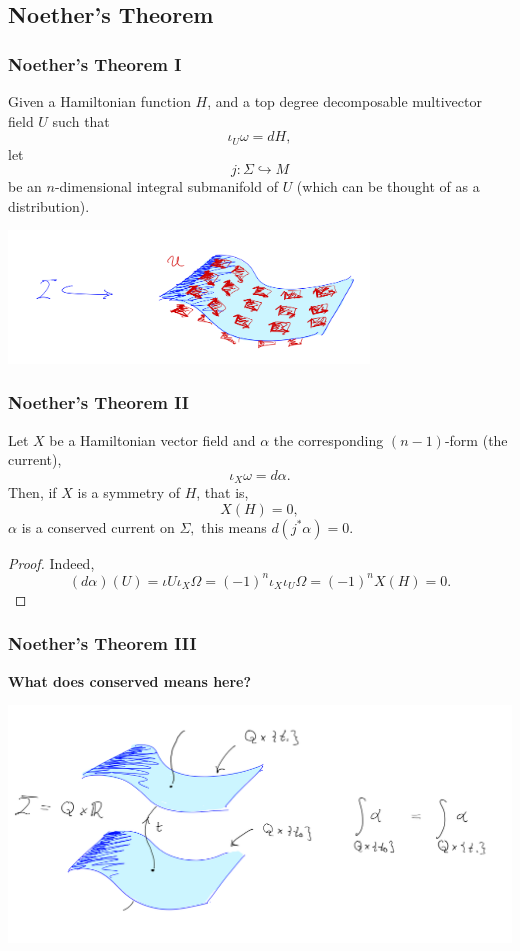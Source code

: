 \subsection{Noether's Theorem}
\begin{frame}
    \frametitle{Noether's Theorem I}
    Given a Hamiltonian function $H$, and a top degree decomposable multivector field $U$ such that 
    $$\iota_U \omega = dH,$$ let $$j: \Sigma \hookrightarrow M$$ be an $n$-dimensional integral submanifold of $U$ (which can be thought of as a distribution).
    \begin{center}
        \includegraphics[height = 100pt]{Images/Multivector_variations.PNG}
    \end{center} 
\end{frame}

\begin{frame}
    \frametitle{Noether's Theorem II}
    \begin{theorem}Let $X$ be a Hamiltonian vector field and $\alpha$ the corresponding $(n-1)$-form (the current), $$\iota_X \omega = d \alpha.$$
        Then, if $X$ is a symmetry of $H$, that is, $$X(H) = 0,$$ $\alpha$ is a \alert{conserved current} on $\Sigma,$ this means
        $d(j^\ast \alpha) = 0.$
    \end{theorem}
    \begin{proof} Indeed,
        $$(d\alpha)(U) = \iota U \iota_X \Omega = (-1)^n \iota_X \iota_U \Omega = (-1)^n X(H) = 0.$$
    \end{proof}
\end{frame}

\begin{frame}
    \frametitle{Noether's Theorem III}
    \begin{center}
        {\large \bf What does \alert{conserved} means here?}
    \end{center}
    \begin{center}
        \includegraphics[width = 330 pt]{Images/Noether_current.PNG}
    \end{center}
\end{frame}

